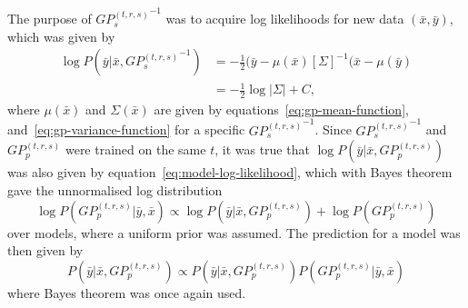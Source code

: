 The purpose of ${GP_s^{(t,r,s)}}^{-1}$ was to acquire log likelihoods for new data $(\bar{x}, \bar{y})$, which was given by
\begin{equation}
  \label{eq:model-log-likelihood}
  \begin{split}
    \log P(\bar{y}|\bar{x}, {GP_s^{(t, r,s)}}^{-1}) & = -\frac{1}{2}(\bar{y} - \mu(\bar{x}){[\Sigma]}^{-1}(\bar{x} - \mu(\bar{y}) \\
    & = -\frac{1}{2}\log{|\Sigma|}+C,
  \end{split}
\end{equation}
where $\mu(\bar{x})$ and $\Sigma(\bar{x})$ are given by equations~\ref{eq:gp-mean-function}, and~\ref{eq:gp-variance-function} for a specific ${GP_s^{(t, r,s)}}^{-1}$. Since ${GP_s^{(t,r,s)}}^{-1}$ and $GP_p^{(t,r,s)}$ were trained on the same $t$, it was true that $\log P(\bar{y}|\bar{x}, GP_p^{(t, r,s)})$ was also given by equation~\ref{eq:model-log-likelihood}, which with Bayes theorem gave the unnormalised log distribution
\begin{equation}
  \label{eq:model-log-model-probability}
  \log P(GP_p^{(t, r,s)} | \bar{y}, \bar{x}) \propto \log P(\bar{y}|\bar{x}, GP_p^{(t, r,s)}) + \log P(GP_p^{(t, r,s)})
\end{equation}
over models, where a uniform prior was assumed. The prediction for a model was then given by
\begin{equation}
  \label{eq:model-prediction-probability}
  P(\bar{y}|\bar{x}, GP_p^{(t, r,s)}) \propto P(\bar{y}|\bar{x}, GP_p^{(t, r,s)})P(GP_p^{(t, r,s)} | \bar{y}, \bar{x})
\end{equation}
where Bayes theorem was once again used.

